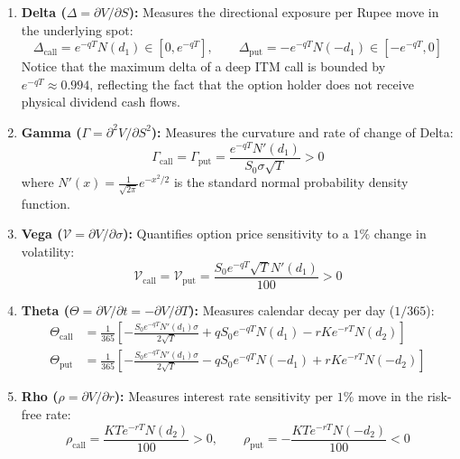 \begin{enumerate}
    \item \textbf{Delta ($\Delta = \partial V / \partial S$):} Measures the directional exposure per Rupee move in the underlying spot:
    \begin{equation}
    \Delta_{\text{call}} = e^{-q T} N(d_1) \in [0, e^{-qT}], \qquad \Delta_{\text{put}} = -e^{-q T} N(-d_1) \in [-e^{-qT}, 0]
    \label{eq:greek_delta}
    \end{equation}
    Notice that the maximum delta of a deep ITM call is bounded by $e^{-qT} \approx 0.994$, reflecting the fact that the option holder does not receive physical dividend cash flows.
    \item \textbf{Gamma ($\Gamma = \partial^2 V / \partial S^2$):} Measures the curvature and rate of change of Delta:
    \begin{equation}
    \Gamma_{\text{call}} = \Gamma_{\text{put}} = \frac{e^{-q T} N'(d_1)}{S_0 \sigma \sqrt{T}} > 0
    \label{eq:greek_gamma}
    \end{equation}
    where $N'(x) = \frac{1}{\sqrt{2\pi}} e^{-x^2 / 2}$ is the standard normal probability density function.
    \item \textbf{Vega ($\mathcal{V} = \partial V / \partial \sigma$):} Quantifies option price sensitivity to a $1\%$ change in volatility:
    \begin{equation}
    \mathcal{V}_{\text{call}} = \mathcal{V}_{\text{put}} = \frac{S_0 e^{-q T} \sqrt{T} N'(d_1)}{100} > 0
    \label{eq:greek_vega}
    \end{equation}
    \item \textbf{Theta ($\Theta = \partial V / \partial t = -\partial V / \partial T$):} Measures calendar decay per day ($1/365$):
    \begin{align}
    \Theta_{\text{call}} &= \frac{1}{365} \left[ -\frac{S_0 e^{-q T} N'(d_1) \sigma}{2 \sqrt{T}} + q S_0 e^{-q T} N(d_1) - r K e^{-r T} N(d_2) \right] \label{eq:greek_theta_call} \\
    \Theta_{\text{put}} &= \frac{1}{365} \left[ -\frac{S_0 e^{-q T} N'(d_1) \sigma}{2 \sqrt{T}} - q S_0 e^{-q T} N(-d_1) + r K e^{-r T} N(-d_2) \right] \label{eq:greek_theta_put}
    \end{align}
    \item \textbf{Rho ($\rho = \partial V / \partial r$):} Measures interest rate sensitivity per $1\%$ move in the risk-free rate:
    \begin{equation}
    \rho_{\text{call}} = \frac{K T e^{-r T} N(d_2)}{100} > 0, \qquad \rho_{\text{put}} = -\frac{K T e^{-r T} N(-d_2)}{100} < 0
    \label{eq:greek_rho}
    \end{equation}
\end{enumerate}

